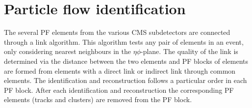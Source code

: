

\section{Particle flow identification}
\label{sec:PF}
The several PF elements from the various CMS subdetectors are connected through a link algorithm. This algorithm tests any pair of elements in an event, only considering nearest neighbours in the $\eta\phi$-plane. The quality of the link is determined via the distance between the two elements and PF blocks of elements are formed from elements with a direct link or indirect link through common elements. The identification and reconstruction follows a particular order in each PF block. After each identification and reconstruction the corresponding PF elements (tracks and clusters) are removed from the PF block.


